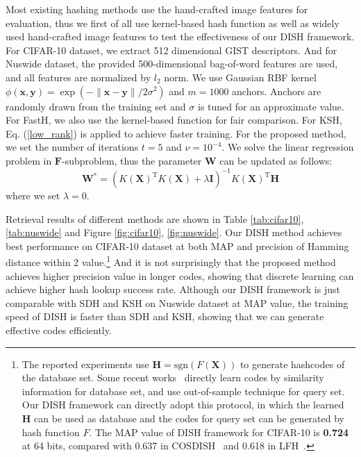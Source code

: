 \documentclass[conference]{IEEEtran}
\begin{document}
Most existing hashing methods use the hand-crafted image features for evaluation, thus we first of all use kernel-based hash function as well as widely used hand-crafted image features to test the effectiveness of our DISH framework. For CIFAR-10 dataset, we extract 512 dimensional GIST descriptors. And for Nuswide dataset, the provided 500-dimensional bag-of-word features are used, and all features are normalized by $l_2$ norm. We use Gaussian RBF kernel $\phi(\mathbf{x}, \mathbf{y}) = \exp (-\| \mathbf{x} - \mathbf{y} \|/2\sigma^2)$ and $m=1000$ anchors. Anchors are randomly drawn from the training set and $\sigma$ is tuned for an approximate value. For FastH, we also use the kernel-based function for fair comparison. For KSH, Eq. (\ref{low_rank}) is applied to achieve faster training. For the proposed method, we set the number of iterations $t=5$ and $\nu=10^{-4}$. We solve the linear regression problem in $\mathbf{F}$-subproblem, thus the parameter $\mathbf{W}$ can be updated as follows:
\begin{equation}
\mathbf{W}^* = (K(\mathbf{X})^\mathrm{T} K(\mathbf{X}) + \lambda \mathbf{I})^{-1} K(\mathbf{X})^\mathrm{T} \mathbf{H}
\end{equation}
where we set $\lambda=0$.

Retrieval results of different methods are shown in Table \ref{tab:cifar10}, \ref{tab:nuswide} and Figure \ref{fig:cifar10}, \ref{fig:nuswide}. Our DISH method achieves best performance on CIFAR-10 dataset at both MAP and precision of Hamming distance within 2 value.\footnote{The  reported experiments use $\mathbf{H}=\mathrm{sgn}(F(\mathbf{X}))$ to generate hashcodes of the database set. Some recent works~\cite{kang2016column,zhang2014supervised} directly learn codes by similarity information for database set, and use out-of-sample technique for query set. Our DISH framework can directly adopt this protocol, in which the learned $\mathbf{H}$ can be used as database and the codes for query set can be generated by hash function $F$. The MAP value of DISH framework for CIFAR-10 is \textbf{0.724} at 64 bits, compared with 0.637 in COSDISH~\cite{kang2016column} and 0.618 in LFH~\cite{zhang2014supervised}.} And it is not surprisingly that the proposed method achieves higher precision value in longer codes, showing that discrete learning can achieve higher hash lookup success rate. Although our DISH framework is just comparable with SDH and KSH on Nuswide dataset at MAP value, the training speed of DISH is faster than SDH and KSH, showing that we can generate effective codes efficiently.
\end{document}
